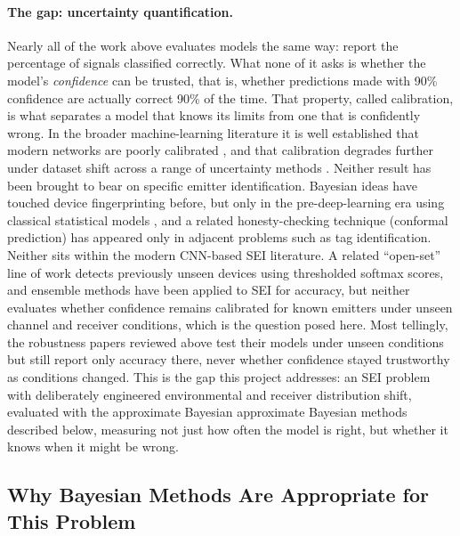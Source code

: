\documentclass{article}
\begin{document}
\paragraph{The gap: uncertainty quantification.}
Nearly all of the work above evaluates models the same way: report the percentage of
signals classified correctly. What none of it asks is whether the model's
\emph{confidence} can be trusted, that is, whether predictions made with 90\% confidence
are actually correct 90\% of the time. That property, called calibration, is what
separates a model that knows its limits from one that is confidently wrong. In the
broader machine-learning literature it is well established that modern networks are
poorly calibrated \citep{guo2017}, and that calibration degrades further under dataset
shift across a range of uncertainty methods \citep{ovadia2019}. Neither result has been
brought to bear on specific emitter identification. Bayesian
ideas have touched device fingerprinting before, but only in the pre-deep-learning era
using classical statistical models \citep{nguyen2011}, and a related honesty-checking
technique (conformal prediction) has appeared only in adjacent problems such as tag
identification. Neither sits within the modern CNN-based SEI literature. A related
``open-set'' line of work detects previously unseen devices using thresholded softmax
scores, and ensemble methods have been applied to SEI for accuracy, but neither evaluates
whether confidence remains calibrated for known emitters under unseen channel and
receiver conditions, which is the question posed here. Most tellingly, the robustness
papers reviewed above test their models under unseen conditions but still report only
accuracy there, never whether confidence stayed trustworthy as conditions changed. This
is the gap this project addresses: an SEI problem with deliberately engineered
environmental and receiver distribution shift, evaluated with the approximate Bayesian
approximate Bayesian methods described below, measuring not just how often the model is
right, but
whether it knows when it might be wrong.

\subsection{Why Bayesian Methods Are Appropriate for This Problem}
\label{sec:bayes}
\end{document}
